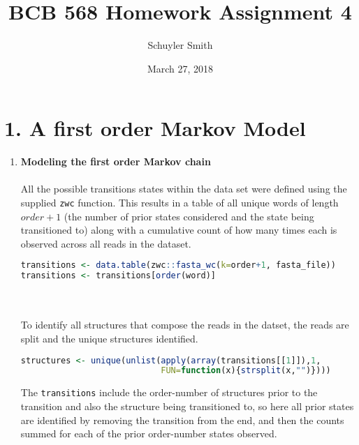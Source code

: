 \documentclass[12pt]{article}
\begin{document}
\setlength{\parindent}{0pt}
\title{\vspace{-1.5cm}
BCB 568 Homework Assignment 4}
\author{Schuyler Smith}
\date{March 27, 2018}
\maketitle
\section*{1. A first order Markov Model}
\begin{enumerate}[label = \textbf{\alph*.}]
  \item \textbf{Modeling the first order Markov chain}\\\\
    All the possible transitions states within the data set were defined using the supplied \texttt{zwc} function. This results in a table of all unique words of length $order+1$ (the number of prior states considered and the state being transitioned to) along with a cumulative count of how many times each is observed across all reads in the dataset.
    \begin{lstlisting}[language=R]
transitions <- data.table(zwc::fasta_wc(k=order+1, fasta_file))
transitions <- transitions[order(word)]
    \end{lstlisting}
    \noindent\begin{minipage}{.45\textwidth}
    \centering
    
    \end{minipage}
    \begin{minipage}{.45\textwidth}
    
    \end{minipage}\\\\
    To identify all structures that compose the reads in the datset, the reads are split and the unique structures identified.
    \begin{lstlisting}[language=R]
structures <- unique(unlist(apply(array(transitions[[1]]),1,
                            FUN=function(x){strsplit(x,"")})))
    \end{lstlisting}
    
    The \texttt{transitions} include the order-number of structures prior to the transition and also the structure being transitioned to, so here all prior states are identified by removing the transition from the end, and then the counts summed for each of the prior order-number states observed.

\end{enumerate}
\end{document}
